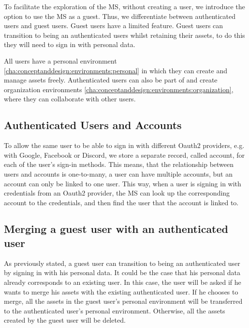 To facilitate the exploration of the MS, without creating a user, we introduce the option
to use the MS as a guest.
Thus, we differentiate between authenticated users and guest users.
Guest users have a limited feature. 
Guest users can transition to being an authenticated users whilst retaining their
assets, to do this they will need to sign in with personal data.

All users have a personal environment \ref{cha:conceptanddesign:environments:personal}
in which they can create and manage assets freely.
Authenticated users can also be part of and create organization environments
\ref{cha:conceptanddesign:environments:organization},
where they can collaborate with other users.

\subsection{Authenticated Users and Accounts}

To allow the same user to be able to sign in with different Oauth2 providers, e.g. with Google,
Facebook or Discord, we store a separate record, called account, for each of the user's sign-in methods.
This means, that the relationship between users and accounts is one-to-many,
a user can have multiple accounts, but an account can only be linked to one user.
This way, when a user is signing in with credentials from an Oauth2 provider, 
the MS can look up the corresponding account to the credentials, and then find the user
that the account is linked to.


\subsection{Merging a guest user with an authenticated user}
\label{cha:conceptanddesign:users:mergeguestuser}

As previously stated, a guest user can transition to being an authenticated user by
signing in with his personal data.
It could be the case that his personal data already corresponds to an existing user.
In this case, the user will be asked if he wants to merge his assets with the existing
authenticated user.
If he chooses to merge, all the assets in the guest user's personal environment will be
transferred to the authenticated user's personal environment.
Otherwise, all the assets created by the guest user will be deleted.

